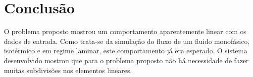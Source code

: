 \documentclass[final,3p]{elsarticle}
\numberwithin{equation}{section}
\begin{document}
\section{Conclusão}

        O problema proposto mostrou um comportamento aparentemente linear com os dados de entrada. Como trata-se da simulação do fluxo de um fluido monofásico, isotérmico e em regime laminar, este comportamento já era esperado. O sistema desenvolvido mostrou que para o problema proposto não há necessidade de fazer muitas subdivisões nos elementos lineares.



\appendix










\end{document}
